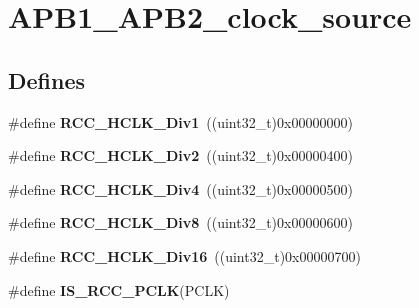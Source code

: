 \hypertarget{group__APB1__APB2__clock__source}{
\section{APB1\_\-APB2\_\-clock\_\-source}
\label{group__APB1__APB2__clock__source}
}
\subsection*{Defines}
\begin{DoxyCompactItemize}
\item 
\hypertarget{group__APB1__APB2__clock__source_gae62b4a39ae69cc221f2ab7d4518bfb76}{
\#define {\bfseries RCC\_\-HCLK\_\-Div1}~((uint32\_\-t)0x00000000)}
\label{group__APB1__APB2__clock__source_gae62b4a39ae69cc221f2ab7d4518bfb76}

\item 
\hypertarget{group__APB1__APB2__clock__source_ga177bb3648def9a961c16f93f15ca0f62}{
\#define {\bfseries RCC\_\-HCLK\_\-Div2}~((uint32\_\-t)0x00000400)}
\label{group__APB1__APB2__clock__source_ga177bb3648def9a961c16f93f15ca0f62}

\item 
\hypertarget{group__APB1__APB2__clock__source_gafd8cf0e32a3ea5648cdc054766bc2017}{
\#define {\bfseries RCC\_\-HCLK\_\-Div4}~((uint32\_\-t)0x00000500)}
\label{group__APB1__APB2__clock__source_gafd8cf0e32a3ea5648cdc054766bc2017}

\item 
\hypertarget{group__APB1__APB2__clock__source_gab2e2b6e0b8fe22d6638b672918b22097}{
\#define {\bfseries RCC\_\-HCLK\_\-Div8}~((uint32\_\-t)0x00000600)}
\label{group__APB1__APB2__clock__source_gab2e2b6e0b8fe22d6638b672918b22097}

\item 
\hypertarget{group__APB1__APB2__clock__source_ga6353aaa0b302fdd5d946fd21756e2273}{
\#define {\bfseries RCC\_\-HCLK\_\-Div16}~((uint32\_\-t)0x00000700)}
\label{group__APB1__APB2__clock__source_ga6353aaa0b302fdd5d946fd21756e2273}

\item 
\#define {\bfseries IS\_\-RCC\_\-PCLK}(PCLK)
\end{DoxyCompactItemize}


